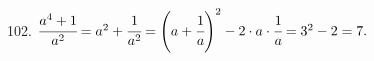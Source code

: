 102. $\cfrac{a^4+1}{a^2}=a^2+\cfrac{1}{a^2}=\left(a+\cfrac{1}{a}\right)^2-2\cdot a\cdot\cfrac{1}{a}=3^2-2=7.$\\
